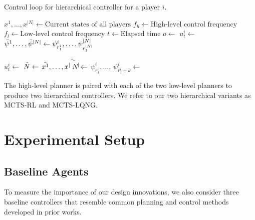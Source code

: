 \begin{algorithm}
\caption{Control loop for hierarchical controller for a player $i$.}\label{alg:control_loop}
\begin{algorithmic}
\State $x^1,\ldots, x^{|N|} \gets \text{Current states of all players}$
\State $f_h \gets \text{High-level control frequency}$
\State $f_l \gets \text{Low-level control frequency}$
\State $t \gets \text{Elapsed time}$
 
 
    \State $o \gets$ 
    \State $u^i_t \gets$ 
    \State $\Bar{\psi}^1,\ldots,\Bar{\psi}^{|N|}  \gets \psi^i_{r^i_{1}},\ldots,\psi^{|N|}_{r^{|N|}_{1}}$ 
    
    
    \State $u^i_t \gets$ 
    \EndIf
\EndIf
{} 
    \State $\Tilde{N} \gets$ 
    \State $\Tilde{x^1},\ldots, \Tilde{x^{|\Tilde{N}|}} \gets$ 
    \State $\psi^i_{r^i_{1}}, ..., \, \psi^i_{r^i_{1} + k} \gets$  
    
\EndIf
\EndIf
\end{algorithmic}
\end{algorithm}

The high-level planner is paired with each of the two low-level planners to produce two hierarchical controllers. We refer to our two hierarchical variants as MCTS-RL and MCTS-LQNG.

\section{Experimental Setup}
\subsection{Baseline Agents}
To measure the importance of our design innovations, we also consider three baseline controllers that resemble common planning and control methods developed in prior works.  
